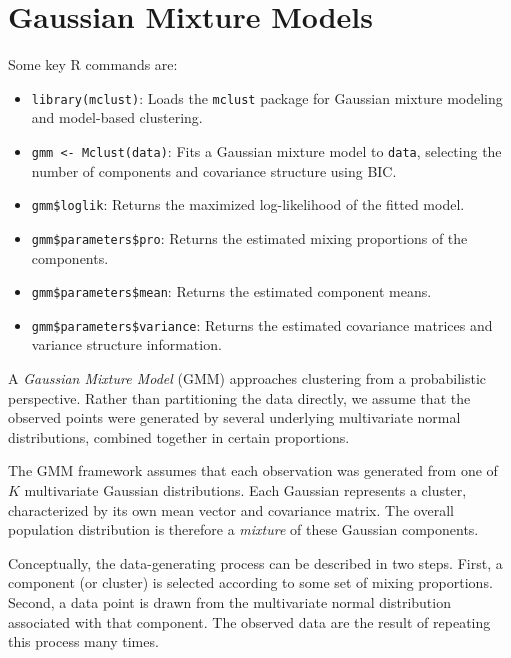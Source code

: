 \section{Gaussian Mixture Models}

\medskip

Some key R commands are:
\begin{itemize}
    \item \texttt{library(mclust)}: Loads the \texttt{mclust} package for Gaussian mixture modeling and model-based clustering.
    
    \item \texttt{gmm <- Mclust(data)}: Fits a Gaussian mixture model to \texttt{data}, selecting the number of components and covariance structure using BIC.
    
    \item \texttt{gmm\$loglik}: Returns the maximized log-likelihood of the fitted model.
    
    \item \texttt{gmm\$parameters\$pro}: Returns the estimated mixing proportions of the components.
    
    \item \texttt{gmm\$parameters\$mean}: Returns the estimated component means.
    
    \item \texttt{gmm\$parameters\$variance}: Returns the estimated covariance matrices and variance structure information.
\end{itemize}

\medskip

A \emph{Gaussian Mixture Model} (GMM) approaches clustering from a probabilistic perspective. Rather than partitioning the data directly, we assume that the observed points were generated by several underlying
multivariate normal distributions, combined together in certain proportions.

The GMM framework assumes that each observation was generated from one of $K$ multivariate Gaussian distributions. Each Gaussian represents a
cluster, characterized by its own mean vector and covariance matrix. The overall population distribution is therefore a \emph{mixture} of these Gaussian components.

Conceptually, the data-generating process can be described in two steps. First, a component (or cluster) is selected according to some set of mixing proportions. Second, a data point is drawn from the multivariate
normal distribution associated with that component. The observed data are the result of repeating this process many times.

